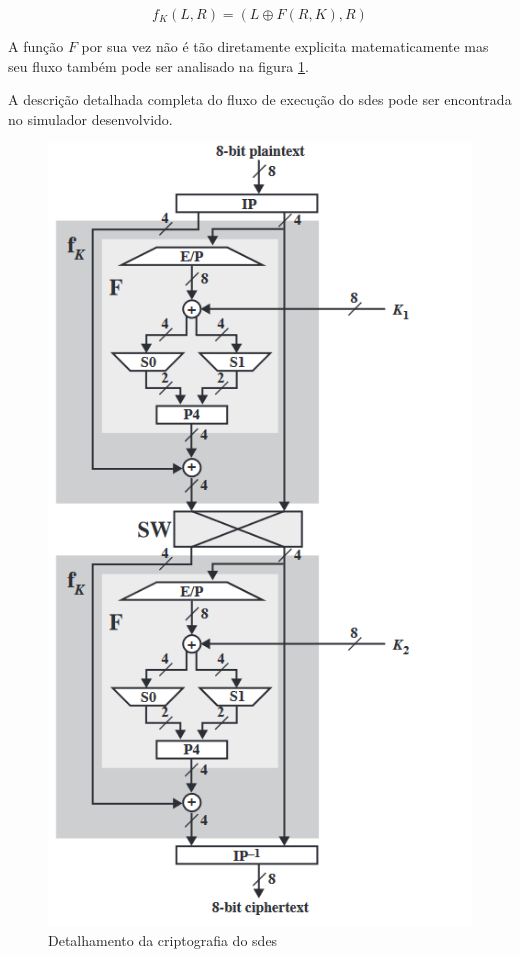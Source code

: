 \[f_K(L, R) = (L \oplus F(R, K), R)\]

A função \(F\) por sua vez não é tão diretamente explicita matematicamente mas seu fluxo também pode ser analisado na figura \ref{fig:sdesdetail}. \cite{stallings10}

A descrição detalhada completa do fluxo de execução do \acrshort{sdes} pode ser encontrada no simulador desenvolvido.

\begin{figure}[H]
    \centering
    \caption{Detalhamento da criptografia do \acrshort{sdes}}
    \label{fig:sdesdetail}
    \includegraphics[width=.5\linewidth]{Figuras/SDESEncrypDetail.png}
\end{figure}

